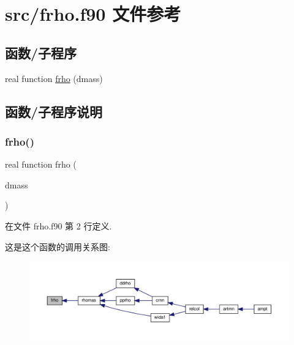 \hypertarget{frho_8f90}{}\section{src/frho.f90 文件参考}
\label{frho_8f90}
\subsection*{函数/子程序}
\begin{DoxyCompactItemize}
\item 
real function \mbox{\hyperlink{frho_8f90_a6982387e0abcc4358752cc064d9dc190}{frho}} (dmass)
\end{DoxyCompactItemize}


\subsection{函数/子程序说明}
\mbox{\label{frho_8f90_a6982387e0abcc4358752cc064d9dc190}} 
\subsubsection{\texorpdfstring{frho()}{frho()}}
{\footnotesize\ttfamily real function frho (\begin{DoxyParamCaption}\item[{}]{dmass }\end{DoxyParamCaption})}



在文件 frho.\+f90 第 2 行定义.

这是这个函数的调用关系图\+:
\nopagebreak
\begin{figure}[H]
\begin{center}
\leavevmode
\includegraphics[width=350pt]{frho_8f90_a6982387e0abcc4358752cc064d9dc190_icgraph}
\end{center}
\end{figure}
